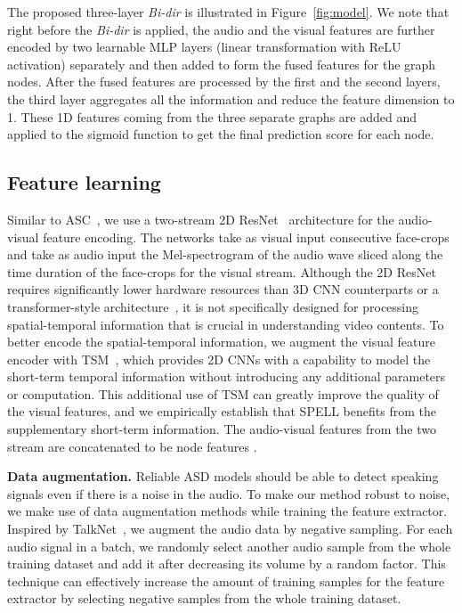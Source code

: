 \documentclass[runningheads]{llncs}
\begin{document}
The proposed three-layer \emph{Bi-dir} is illustrated in Figure~\ref{fig:model}. We note that right before the \emph{Bi-dir} is applied, the audio and the visual features are further encoded by two learnable MLP layers (linear transformation with ReLU activation) separately and then added to form the fused features for the graph nodes. After the fused features are processed by the first and the second layers, the third layer aggregates all the information and reduce the feature dimension to 1. These 1D features coming from the three separate graphs are added and applied to the sigmoid function to get the final prediction score for each node.


\subsection{Feature learning}\label{subsec:aug}
Similar to ASC~\cite{alcazarActiveSpeakersContext2020}, we use a two-stream 2D ResNet~\cite{he2016deep} architecture for the audio-visual feature encoding. The networks take as visual input  consecutive face-crops and take as audio input the Mel-spectrogram of the audio wave sliced along the time duration of the face-crops for the visual stream. Although the 2D ResNet requires significantly lower hardware resources than 3D CNN counterparts or a transformer-style architecture~\cite{vaswani2017attention}, it is not specifically designed for processing spatial-temporal information that is crucial in understanding video contents. To better encode the spatial-temporal information, we augment the visual feature encoder with TSM~\cite{lin2019tsm}, which provides 2D CNNs with a capability to model the short-term temporal information without introducing any additional parameters or computation. This additional use of TSM can greatly improve the quality of the visual features, and we empirically establish that SPELL benefits from the supplementary short-term information. The audio-visual features from the two stream are concatenated to be node features .

\textbf{Data augmentation. } Reliable ASD models should be able to detect speaking signals even if there is a noise in the audio. To make our method robust to noise, we make use of data augmentation methods while training the feature extractor. Inspired by TalkNet~\cite{tao2021someone}, we augment the audio data by negative sampling. For each audio signal in a batch, we randomly select another audio sample from the whole training dataset and add it after decreasing its volume by a random factor. This technique can effectively increase the amount of training samples for the feature extractor by selecting negative samples from the whole training dataset.
\end{document}
